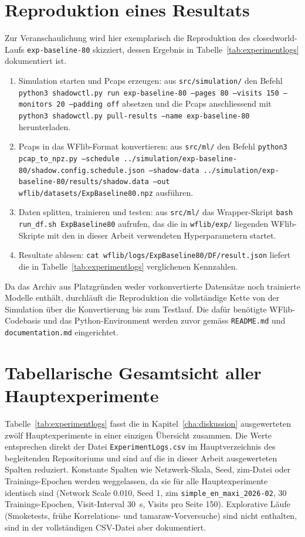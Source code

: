 \section{Reproduktion eines Resultats}
\label{app:begleitmaterial_reproduktion}

Zur Veranschaulichung wird hier exemplarisch die Reproduktion des \gls{closedworld}-Laufs \texttt{exp-baseline-80} skizziert, dessen Ergebnis in Tabelle~\ref{tab:experimentlogs} dokumentiert ist.

\begin{enumerate}
    \item Simulation starten und Pcaps erzeugen: aus \texttt{src/simulation/} den Befehl
        \texttt{python3 shadowctl.py run exp-baseline-80 --pages 80 --visits 150 --monitors 20 --padding off}
        absetzen und die Pcaps anschliessend mit \texttt{python3 shadowctl.py pull-results --name exp-baseline-80} herunterladen.
    \item Pcaps in das WFlib-Format konvertieren: aus \texttt{src/ml/} den Befehl
        \texttt{python3 pcap\_to\_npz.py --schedule ../simulation/exp-baseline-80/shadow.config.schedule.json --shadow-data ../simulation/exp-baseline-80/results/shadow.data --out wflib/datasets/ExpBaseline80.npz}
        ausführen.
    \item Daten splitten, trainieren und testen: aus \texttt{src/ml/} das Wrapper-Skript \texttt{bash run\_df.sh ExpBaseline80} aufrufen, das die in \texttt{wflib/exp/} liegenden WFlib-Skripte mit den in dieser Arbeit verwendeten Hyperparametern startet.
    \item Resultate ablesen: \texttt{cat wflib/logs/ExpBaseline80/DF/result.json} liefert die in Tabelle~\ref{tab:experimentlogs} verglichenen Kennzahlen.
\end{enumerate}

Da das Archiv aus Platzgründen weder vorkonvertierte Datensätze noch trainierte Modelle enthält, durchläuft die Reproduktion die vollständige Kette von der Simulation über die Konvertierung bis zum Testlauf.
Die dafür benötigte WFlib-Codebasis und das Python-Environment werden zuvor gemäss \texttt{README.md} und \texttt{documentation.md} eingerichtet.

\section{Tabellarische Gesamtsicht aller Hauptexperimente}
\label{app:experimentlogs}

Tabelle~\ref{tab:experimentlogs} fasst die in Kapitel~\ref{cha:diskussion} ausgewerteten zwölf Hauptexperimente in einer einzigen Übersicht zusammen.
Die Werte entsprechen direkt der Datei \texttt{ExperimentLogs.csv} im Hauptverzeichnis des begleitenden Repositoriums und sind auf die in dieser Arbeit ausgewerteten Spalten reduziert.
Konstante Spalten wie Netzwerk-Skala, Seed, \gls{zim}-Datei oder Trainings-Epochen werden weggelassen, da sie für alle Hauptexperimente identisch sind (Network Scale 0.010, Seed 1, \gls{zim} \texttt{simple\_en\_maxi\_2026-02}, 30 Trainings-Epochen, Visit-Interval 30~s, Visits pro Seite 150).
Explorative Läufe (Smoketests, frühe Korrelations- und \gls{tamaraw}-Vorversuche) sind nicht enthalten, sind in der vollständigen CSV-Datei aber dokumentiert.

